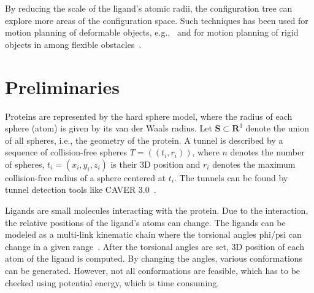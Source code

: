 \documentclass{svmult}
\def\probe{r_{\mathrm{probe}}}
\def\Sprobe{S_{\mathrm{probe}}}
\def\SS{\mathbf{S}}
\begin{document}
%


By reducing the scale of the ligand's atomic radii, the configuration tree can explore more areas of the configuration space.
Such techniques has been used for motion planning of deformable objects, 
e.g.,~\cite{frank2008efficient,bayazit2001ligand,alterovitz2008motion,lamiraux2001flexible,kavraki1998towards,gayle2005path} 
and for motion planning of rigid objects in among 
flexible obstacles~\cite{rodriguez2006planning,frank2008efficient,phillips2014representation}.





\section{Preliminaries}

Proteins are represented by the hard sphere model, where the radius of each sphere (atom) is given by its van der Waals radius.
Let $\SS \subset \mathbf{R}^3$ denote the union of all spheres, i.e., the geometry of the protein.
A tunnel is described by a sequence of collision-free spheres $T=( (t_i, r_i) )$, where $n$ denotes the number of spheres,
$t_i=(x_i,y_i,z_i)$ is their 3D position and $r_i$ denotes the maximum collision-free radius of a sphere centered at $t_i$. 
The tunnels can be found by tunnel detection tools like CAVER 3.0~\cite{caver3}.

Ligands are small molecules interacting with the protein. 
Due to the interaction, the relative positions of the ligand's atoms can change.
The ligands can be modeled as a multi-link kinematic chain where the torsional angles phi/psi can change in a given range~\cite{songPFpath}.
After the torsional angles are set, 3D position of each atom of the ligand is computed.
By changing the angles, various conformations can be generated.
However, not all conformations are feasible, which has to be checked using potential energy, which is time consuming.
\end{document}

